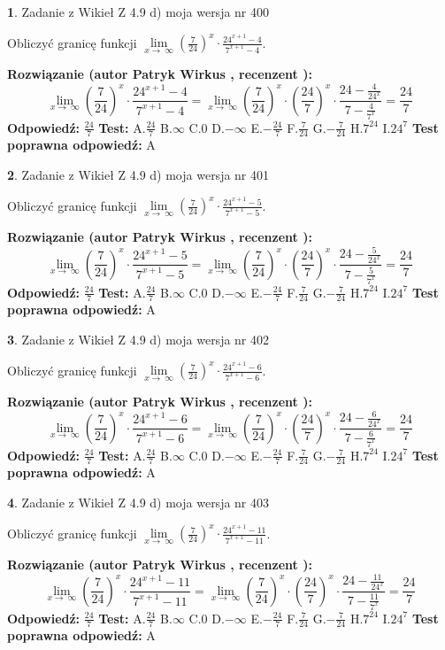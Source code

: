\documentclass[12pt, a4paper]{article}
\theoremstyle{definition} %
\newtheorem{zad}{}
\newcommand{\zadStart}[1]{\begin{zad}#1\newline}
\newcommand{\zadStop}{\end{zad}}
\newcommand{\rozwStart}[2]{\noindent \textbf{Rozwiązanie (autor #1 , recenzent #2): }\newline}
\newcommand{\rozwStop}{\newline}
\newcommand{\odpStart}{\noindent \textbf{Odpowiedź:}\newline}
\newcommand{\odpStop}{\newline}
\newcommand{\testStart}{\noindent \textbf{Test:}\newline}
\newcommand{\testStop}{\newline}
\newcommand{\kluczStart}{\noindent \textbf{Test poprawna odpowiedź:}\newline}
\newcommand{\kluczStop}{\newline}
\begin{document}
\zadStart{Zadanie z Wikieł Z 4.9 d) moja wersja nr 400}


Obliczyć granicę funkcji  $\lim\limits_{x\to\ \infty}(\frac{7}{24})^{x}\cdot\frac{24^{x+1}-4}{7^{x+1}-4}$.
\zadStop
\rozwStart{Patryk Wirkus}{}
$$\lim\limits_{x\to\ \infty}(\frac{7}{24})^{x}\cdot\frac{24^{x+1}-4}{7^{x+1}-4}=\lim\limits_{x\to\ \infty}(\frac{7}{24})^{x}\cdot(\frac{24}{7})^{x} \cdot \frac{24-\frac{4}{24^{x}}}{7-\frac{4}{7^{x}}} = \frac{24}{7}$$
\rozwStop
\odpStart
$\frac{24}{7}$
\odpStop
\testStart
A.$\frac{24}{7}$ B.$\infty$ C.$0$ D.$-\infty$ E.$-\frac{24}{7}$
F.$\frac{7}{24}$ G.$-\frac{7}{24}$
H.$7^{24}$
I.$24^{7}$
\testStop
\kluczStart
A
\kluczStop



\zadStart{Zadanie z Wikieł Z 4.9 d) moja wersja nr 401}


Obliczyć granicę funkcji  $\lim\limits_{x\to\ \infty}(\frac{7}{24})^{x}\cdot\frac{24^{x+1}-5}{7^{x+1}-5}$.
\zadStop
\rozwStart{Patryk Wirkus}{}
$$\lim\limits_{x\to\ \infty}(\frac{7}{24})^{x}\cdot\frac{24^{x+1}-5}{7^{x+1}-5}=\lim\limits_{x\to\ \infty}(\frac{7}{24})^{x}\cdot(\frac{24}{7})^{x} \cdot \frac{24-\frac{5}{24^{x}}}{7-\frac{5}{7^{x}}} = \frac{24}{7}$$
\rozwStop
\odpStart
$\frac{24}{7}$
\odpStop
\testStart
A.$\frac{24}{7}$ B.$\infty$ C.$0$ D.$-\infty$ E.$-\frac{24}{7}$
F.$\frac{7}{24}$ G.$-\frac{7}{24}$
H.$7^{24}$
I.$24^{7}$
\testStop
\kluczStart
A
\kluczStop



\zadStart{Zadanie z Wikieł Z 4.9 d) moja wersja nr 402}


Obliczyć granicę funkcji  $\lim\limits_{x\to\ \infty}(\frac{7}{24})^{x}\cdot\frac{24^{x+1}-6}{7^{x+1}-6}$.
\zadStop
\rozwStart{Patryk Wirkus}{}
$$\lim\limits_{x\to\ \infty}(\frac{7}{24})^{x}\cdot\frac{24^{x+1}-6}{7^{x+1}-6}=\lim\limits_{x\to\ \infty}(\frac{7}{24})^{x}\cdot(\frac{24}{7})^{x} \cdot \frac{24-\frac{6}{24^{x}}}{7-\frac{6}{7^{x}}} = \frac{24}{7}$$
\rozwStop
\odpStart
$\frac{24}{7}$
\odpStop
\testStart
A.$\frac{24}{7}$ B.$\infty$ C.$0$ D.$-\infty$ E.$-\frac{24}{7}$
F.$\frac{7}{24}$ G.$-\frac{7}{24}$
H.$7^{24}$
I.$24^{7}$
\testStop
\kluczStart
A
\kluczStop



\zadStart{Zadanie z Wikieł Z 4.9 d) moja wersja nr 403}


Obliczyć granicę funkcji  $\lim\limits_{x\to\ \infty}(\frac{7}{24})^{x}\cdot\frac{24^{x+1}-11}{7^{x+1}-11}$.
\zadStop
\rozwStart{Patryk Wirkus}{}
$$\lim\limits_{x\to\ \infty}(\frac{7}{24})^{x}\cdot\frac{24^{x+1}-11}{7^{x+1}-11}=\lim\limits_{x\to\ \infty}(\frac{7}{24})^{x}\cdot(\frac{24}{7})^{x} \cdot \frac{24-\frac{11}{24^{x}}}{7-\frac{11}{7^{x}}} = \frac{24}{7}$$
\rozwStop
\odpStart
$\frac{24}{7}$
\odpStop
\testStart
A.$\frac{24}{7}$ B.$\infty$ C.$0$ D.$-\infty$ E.$-\frac{24}{7}$
F.$\frac{7}{24}$ G.$-\frac{7}{24}$
H.$7^{24}$
I.$24^{7}$
\testStop
\kluczStart
A
\kluczStop
\end{document}
